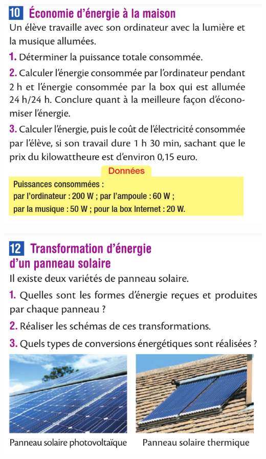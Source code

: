 \documentclass[10pt]{article}
\newcommand{\scalingby}{0.36}
\begin{document}
\begin{minipage}[c]{0.45\textwidth}
	\includegraphics[scale=\scalingby]{10.png}
\end{minipage}
\begin{minipage}[c]{0.45\textwidth}
	\includegraphics[scale=\scalingby]{12.png}
\end{minipage}
\end{document}
